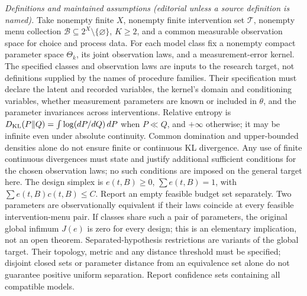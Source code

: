 \documentclass[11pt,a4paper]{article}
\begin{document}
\emph{Definitions and maintained assumptions (editorial unless a source definition is named).} Take nonempty finite \(X\), nonempty finite intervention set \(\mathcal T\), nonempty menu collection \(\mathcal B\subseteq 2^X\setminus\{\varnothing\}\), \(K\ge2\), and a common measurable observation space for choice and process data. For each model class fix a nonempty compact parameter space \(\Theta_k\), its joint observation laws, and a measurement-error kernel. The specified classes and observation laws are inputs to the research target, not definitions supplied by the names of procedure families. Their specification must declare the latent and recorded variables, the kernel's domain and conditioning variables, whether measurement parameters are known or included in \(\theta\), and the parameter invariances across interventions. Relative entropy is \(D_{\rm KL}(P\Vert Q)=\int\log(dP/dQ)\,dP\) when \(P\ll Q\), and \(+\infty\) otherwise; it may be infinite even under absolute continuity. Common domination and upper-bounded densities alone do not ensure finite or continuous KL divergence. Any use of finite continuous divergences must state and justify additional sufficient conditions for the chosen observation laws; no such conditions are imposed on the general target here. The design simplex is \(e(t,B)\ge0\), \(\sum e(t,B)=1\), with \(\sum e(t,B)c(t,B)\le C\). Report an empty feasible budget set separately. Two parameters are observationally equivalent if their laws coincide at every feasible intervention-menu pair. If classes share such a pair of parameters, the original global infimum \(J(e)\) is zero for every design; this is an elementary implication, not an open theorem. Separated-hypothesis restrictions are variants of the global target. Their topology, metric and any distance threshold must be specified; disjoint closed sets or parameter distance from an equivalence set alone do not guarantee positive uniform separation. Report confidence sets containing all compatible models.
\end{document}
